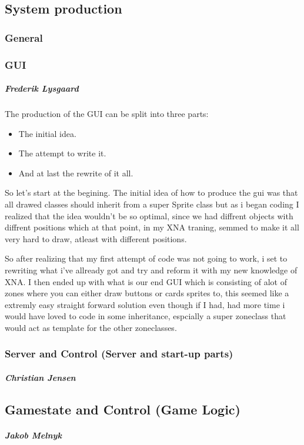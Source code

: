 \subsection{System production}
\subsubsection{General}

\subsubsection{GUI}
\subparagraph{Frederik Lysgaard}
The production of the GUI can be split into three parts:
\begin{itemize}
\item The initial idea.
\item The attempt to write it.
\item  And at last the rewrite of it all.
\end{itemize}
 So let's start at the begining. The initial idea of how to produce the gui was that all drawed classes should inherit from a super Sprite class but as i began coding I realized that the idea wouldn't be so optimal, since we had diffrent objects with diffrent positions which at that point, in my XNA traning, semmed to make it all very hard to draw, atleast with different positions.

 So after realizing that my first attempt of code was not going to work, i set to rewriting what i've allready got and try and reform it with my new knowledge of XNA.
I then ended up with what is our end GUI which is consisting of alot of zones where you can either draw buttons or cards sprites to, this seemed like a extremly easy straight forward solution even though if I had, had more time i would have loved to code in some inheritance, espcially a super zoneclass that would act as template for the other zoneclasses.

\subsubsection{Server and Control (Server and start-up parts)}
\subparagraph{Christian Jensen}

\subsection{Gamestate and Control (Game Logic)}
\subparagraph{Jakob Melnyk}
